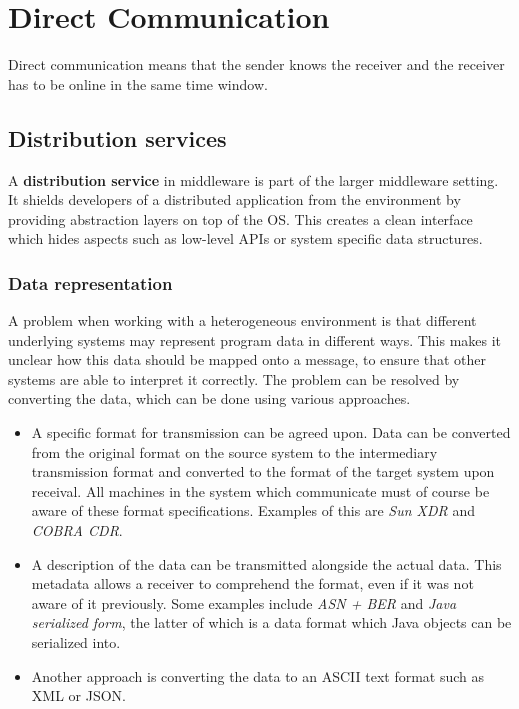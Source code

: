 \documentclass[a4paper]{article}
\begin{document}
\newpage

\section{Direct Communication}

Direct communication means that the sender knows the receiver and the receiver has to be online in the same time window.

\subsection{Distribution services}

A \textbf{distribution service} in middleware is part of the larger middleware setting. It shields developers of a distributed application from the environment by providing abstraction layers on top of the OS. This creates a clean interface which hides aspects such as low-level APIs or system specific data structures.

\subsubsection{Data representation}

A problem when working with a heterogeneous environment is that different underlying systems may represent program data in different ways. This makes it unclear how this data should be mapped onto a message, to ensure that other systems are able to interpret it correctly. The problem can be resolved by converting the data, which can be done using various approaches.

\begin{itemize}
\item A specific format for transmission can be agreed upon. Data can be converted from the original format on the source system to the intermediary transmission format and converted to the format of the target system upon receival. All machines in the system which communicate must of course be aware of these format specifications. Examples of this are \textit{Sun XDR} and \textit{COBRA CDR}.
\item A description of the data can be transmitted alongside the actual data. This metadata allows a receiver to comprehend the format, even if it was not aware of it previously. Some examples include \textit{ASN + BER} and \textit{Java serialized form}, the latter of which is a data format which Java objects can be serialized into.
\item Another approach is converting the data to an ASCII text format such as XML or JSON.
\end{itemize}
\end{document}
